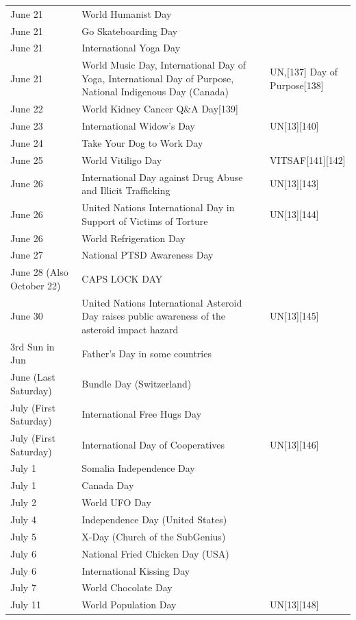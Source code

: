 \documentclass[
]{book}
\begin{document}
\begin{longtable}[t]{>{\raggedright\arraybackslash}p{8em}>{\raggedright\arraybackslash}p{20em}>{\raggedright\arraybackslash}p{12em}}
June 21 & World Humanist Day & \\
June 21 & Go Skateboarding Day & \\
June 21 & International Yoga Day & \\
June 21 & World Music Day, International Day of Yoga, International Day of Purpose, National Indigenous Day (Canada) & UN,[137] Day of Purpose[138]\\
\addlinespace
June 22 & World Kidney Cancer Q\&A Day[139] & \\
June 23 & International Widow's Day & UN[13][140]\\
June 24 & Take Your Dog to Work Day & \\
June 25 & World Vitiligo Day & VITSAF[141][142]\\
June 26 & International Day against Drug Abuse and Illicit Trafficking & UN[13][143]\\
\addlinespace
June 26 & United Nations International Day in Support of Victims of Torture & UN[13][144]\\
June 26 & World Refrigeration Day & \\
June 27 & National PTSD Awareness Day & \\
June 28 (Also October 22) & CAPS LOCK DAY & \\
June 30 & United Nations International Asteroid Day raises public awareness of the asteroid impact hazard & UN[13][145]\\
\addlinespace
3rd Sun in Jun & Father's Day in some countries & \\
June (Last Saturday) & Bundle Day (Switzerland) & \\
July (First Saturday) & International Free Hugs Day & \\
July (First Saturday) & International Day of Cooperatives & UN[13][146]\\
July 1 & Somalia Independence Day & \\
\addlinespace
July 1 & Canada Day & \\
July 2 & World UFO Day & \\
July 4 & Independence Day (United States) & \\
July 5 & X-Day (Church of the SubGenius) & \\
July 6 & National Fried Chicken Day (USA) & \\
\addlinespace
July 6 & International Kissing Day & [147]\\
July 7 & World Chocolate Day & \\
July 11 & World Population Day & UN[13][148]\\

\end{longtable}
\end{document}
